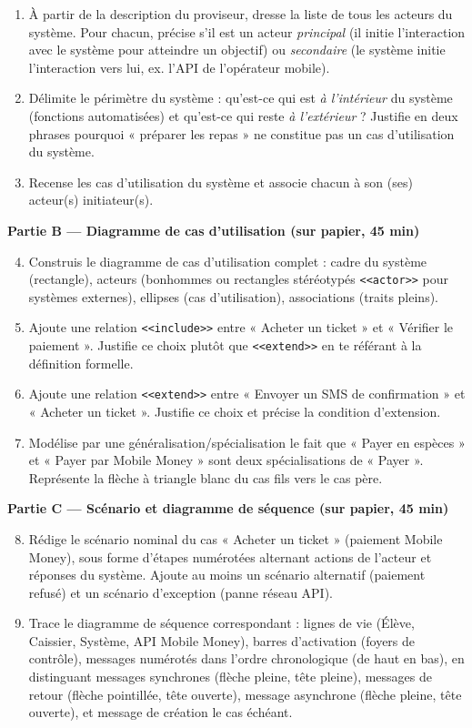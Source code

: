 \documentclass[11pt]{article}
\newcommand{\cle}[1]{{\popxbold\color{popdark}#1}}
\begin{document}
\begin{enumerate}
  \item À partir de la description du proviseur, dresse la liste de tous les \cle{acteurs} du système. Pour chacun, précise s'il est un acteur \emph{principal} (il initie l'interaction avec le système pour atteindre un objectif) ou \emph{secondaire} (le système initie l'interaction vers lui, ex. l'API de l'opérateur mobile).
  \item Délimite le \cle{périmètre} du système : qu'est-ce qui est \emph{à l'intérieur} du système (fonctions automatisées) et qu'est-ce qui reste \emph{à l'extérieur} ? Justifie en deux phrases pourquoi « préparer les repas » ne constitue pas un cas d'utilisation du système.
  \item Recense les \cle{cas d'utilisation} du système et associe chacun à son (ses) acteur(s) initiateur(s).
\end{enumerate}

\textbf{Partie B — Diagramme de cas d'utilisation (sur papier, 45 min)}

\begin{enumerate}
  \setcounter{enumi}{3}
  \item Construis le diagramme de cas d'utilisation complet : cadre du système (rectangle), acteurs (bonhommes ou rectangles stéréotypés \texttt{<<actor>>} pour systèmes externes), ellipses (cas d'utilisation), associations (traits pleins).
  \item Ajoute une relation \texttt{<<include>>} entre « Acheter un ticket » et « Vérifier le paiement ». Justifie ce choix plutôt que \texttt{<<extend>>} en te référant à la définition formelle.
  \item Ajoute une relation \texttt{<<extend>>} entre « Envoyer un SMS de confirmation » et « Acheter un ticket ». Justifie ce choix et précise la condition d'extension.
  \item Modélise par une \cle{généralisation/spécialisation} le fait que « Payer en espèces » et « Payer par Mobile Money » sont deux spécialisations de « Payer ». Représente la flèche à triangle blanc du cas fils vers le cas père.
\end{enumerate}

\textbf{Partie C — Scénario et diagramme de séquence (sur papier, 45 min)}

\begin{enumerate}
  \setcounter{enumi}{7}
  \item Rédige le \cle{scénario nominal} du cas « Acheter un ticket » (paiement Mobile Money), sous forme d'étapes numérotées alternant actions de l'acteur et réponses du système. Ajoute au moins un scénario alternatif (paiement refusé) et un scénario d'exception (panne réseau API).
  \item Trace le \cle{diagramme de séquence} correspondant : lignes de vie (Élève, Caissier, Système, API Mobile Money), barres d'activation (foyers de contrôle), messages numérotés dans l'ordre chronologique (de haut en bas), en distinguant messages synchrones (flèche pleine, tête pleine), messages de retour (flèche pointillée, tête ouverte), message asynchrone (flèche pleine, tête ouverte), et message de création le cas échéant.
\end{enumerate}
\end{document}
